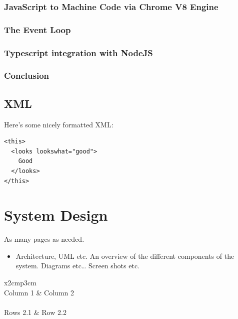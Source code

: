 \subsection{JavaScript to Machine Code via Chrome V8 Engine}

\subsection{The Event Loop}

\subsection{Typescript integration with NodeJS}

\subsection{Conclusion}





	




\section{XML}
Here's some nicely formatted XML:
\begin{verbatim}
<this>
  <looks lookswhat="good">
    Good
  </looks>
</this>
\end{verbatim}

\chapter{System Design}
As many pages as needed.
\begin{itemize}
\item Architecture, UML etc. An overview of the different components of the system. Diagrams etc… Screen shots etc.
\end{itemize}

\begin{table}[h]
  \centering
  \begin{tabular}{x{2cm}p{3cm}}
    \toprule \\
    Column 1 & Column 2 \\
    \midrule \\
    Rows 2.1 & Row 2.2 \\
    \bottomrule
  \end{tabular}
  \caption{A table.}
  \label{table:mytable}
\end{table}

